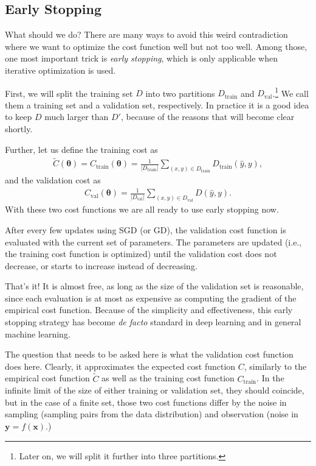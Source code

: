 \documentclass{report}
\newcommand{\vect}[1]{\mathbf{#1}}
\newcommand{\vects}[1]{\boldsymbol{#1}}
\newcommand{\vx}[0]{\vect{x}}
\newcommand{\vy}[0]{\vect{y}}
\newcommand{\TT}[0]{\vects{\theta}}
\newcommand{\train}{\text{train}}
\newcommand{\val}{\text{val}}
\begin{document}
\subsection{Early Stopping}
What should we do? There are many ways to avoid this weird contradiction where
we want to optimize the cost function well but not too well. Among those, one
most important trick is {\em early stopping}, which is only applicable when
iterative optimization is used.

First, we will split the training set $D$ into two partitions $D_{\train}$ and
$D_{\val}$.\footnote{
    Later on, we will split it further into three partitions.
}
We call them a training set and a validation set, respectively. In practice it
is a good idea to keep $D$ much larger than $D'$, because of the reasons that
will become clear shortly.

Further, let us define the training cost as
\begin{align}
    \label{eq:train_c}
    \tilde{C}(\TT) = C_{\train}(\TT) = \frac{1}{|D_{\train}|} \sum_{(x,y) \in
    D_{\train}} D_{\train}(\hat{y}, y),
\end{align}
and the validation cost as
\begin{align}
    \label{eq:val_c}
    C_{\val}(\TT) = \frac{1}{|D_{\val}|} \sum_{(x,y) \in D_{\val}} D(\hat{y}, y).
\end{align}
With these two cost functions we are all ready to use early stopping now. 

After every few updates using SGD (or GD), the validation cost function is
evaluated with the current set of parameters. The parameters are updated (i.e.,
the training cost function is optimized) until the validation cost does not
decrease, or starts to increase instead of decreasing.

That's it! It is almost free, as long as the size of the validation set is
reasonable, since each evaluation is at most as expensive as computing the
gradient of the empirical cost function. Because of the simplicity and
effectiveness, this early stopping strategy has become {\em de facto} standard
in deep learning and in general machine learning.

The question that needs to be asked here is what the validation cost function
does here. Clearly, it approximates the expected cost function $C$, similarly to
the empirical cost function $\tilde{C}$ as well as the training cost function
$C_{\train}$. In the infinite limit of the size of either training or validation
set, they should coincide, but in the case of a finite set, those two cost
functions differ by the noise in sampling (sampling pairs from the data
distribution) and observation (noise in $\vy=f(\vx)$.)
\end{document}

